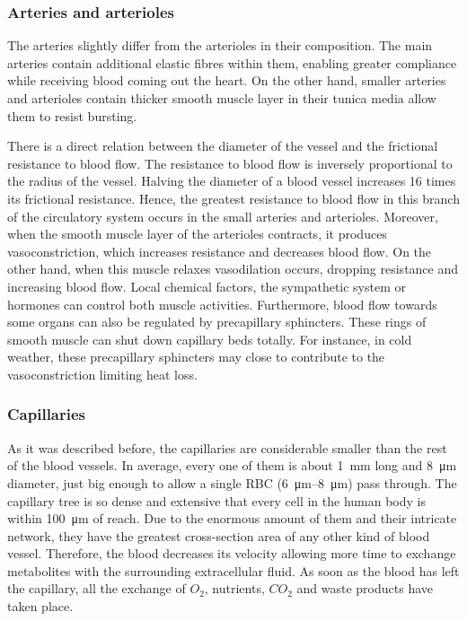 \subsubsection{Arteries and arterioles}
The arteries slightly differ from the arterioles in their composition. The main arteries contain additional elastic fibres within them, enabling greater compliance while receiving blood coming out the heart. On the other hand, smaller arteries and arterioles contain thicker smooth muscle layer in their tunica media allow them to resist bursting.  

There is a direct relation between the diameter of the vessel and the frictional resistance to blood flow. The resistance to blood flow is inversely proportional to the radius of the vessel. Halving the diameter of a blood vessel increases 16 times its frictional resistance. Hence, the greatest resistance to blood flow in this branch of the circulatory system occurs in the small arteries and arterioles. Moreover, when the smooth muscle layer of the arterioles contracts, it produces vasoconstriction, which increases resistance and decreases blood flow. On the other hand, when this muscle relaxes vasodilation occurs, dropping resistance and increasing blood flow. Local chemical factors, the sympathetic system or hormones can control both muscle activities. Furthermore, blood flow towards some organs can also be regulated by precapillary sphincters. These rings of smooth muscle can shut down capillary beds totally. For instance, in cold weather, these precapillary sphincters may close to contribute to the vasoconstriction limiting heat loss.  

\subsubsection{Capillaries}
As it was described before, the capillaries are considerable smaller than the rest of the blood vessels. In average, every one of them is about \SI{1}{\milli\meter} long and \SI{8}{\micro\meter} diameter, just big enough to allow a single RBC (\SIrange{6}{8}{\micro\meter}) pass through. The capillary tree is so dense and extensive that every cell in the human body is within \SI{100}{\micro\meter} of reach.  Due to the enormous amount of them and their intricate network,  they have the greatest cross-section area of any other kind of blood vessel. Therefore, the blood decreases its velocity allowing more time to exchange metabolites with the surrounding extracellular fluid. As soon as the blood has left the capillary, all the exchange of $O_2$, nutrients, $CO_2$ and waste products have taken place. 

